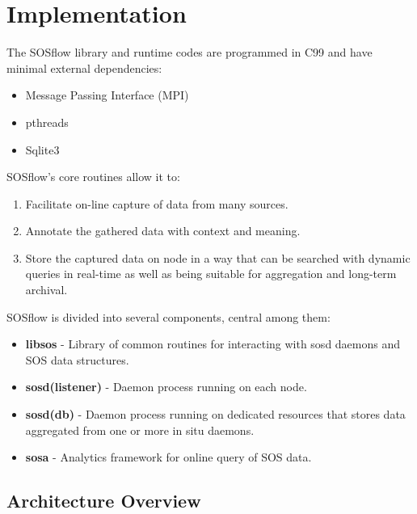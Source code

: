 \section{Implementation}
%
The SOSflow library and runtime codes are programmed in C99 and have
minimal external dependencies:
%
\begin{itemize}
    \item Message Passing Interface (MPI)
    \item pthreads
    \item Sqlite3
\end{itemize}
%
SOSflow's core routines allow it to:
%
\begin{enumerate}
    \item Facilitate on-line capture of data from many sources.
    \item Annotate the gathered data with context and meaning.
    \item Store the captured data on node in a way that can be
      searched with dynamic queries in real-time as well as being
      suitable for aggregation and long-term archival.
\end{enumerate}
%
%
SOSflow is divided into several components, central among them:
%
\begin{itemize}
    \item \textbf{libsos} - Library of common routines for interacting with
      sosd daemons and SOS data structures.
    \item \textbf{sosd(listener)} - Daemon process running on each node.
    \item \textbf{sosd(db)} - Daemon process running on dedicated resources
      that stores data aggregated from one or more in situ daemons.
    \item \textbf{sosa} - Analytics framework for online query of SOS data.
\end{itemize}

\subsection{Architecture Overview} %


